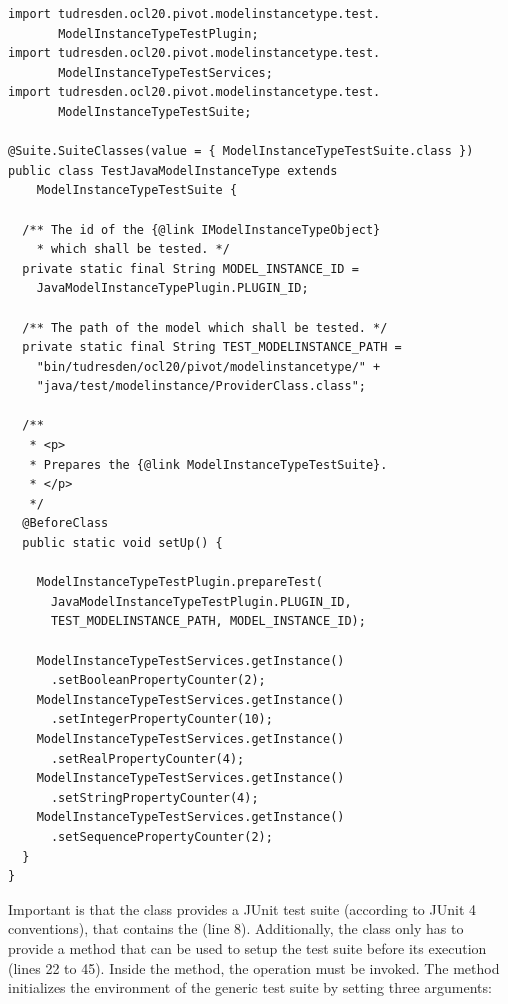 \lstset{
  language=Java
}
\begin{lstlisting}[caption={An instantiation of the generic model instance test suite.}, captionpos=b, label=list:modelInstanceTestSuite:constraints01, float]
import tudresden.ocl20.pivot.modelinstancetype.test.
       ModelInstanceTypeTestPlugin;
import tudresden.ocl20.pivot.modelinstancetype.test.
       ModelInstanceTypeTestServices;
import tudresden.ocl20.pivot.modelinstancetype.test.
       ModelInstanceTypeTestSuite;

@Suite.SuiteClasses(value = { ModelInstanceTypeTestSuite.class })
public class TestJavaModelInstanceType extends 
    ModelInstanceTypeTestSuite {

  /** The id of the {@link IModelInstanceTypeObject} 
    * which shall be tested. */
  private static final String MODEL_INSTANCE_ID =
    JavaModelInstanceTypePlugin.PLUGIN_ID;

  /** The path of the model which shall be tested. */
  private static final String TEST_MODELINSTANCE_PATH =
    "bin/tudresden/ocl20/pivot/modelinstancetype/" +
    "java/test/modelinstance/ProviderClass.class";

  /**
   * <p>
   * Prepares the {@link ModelInstanceTypeTestSuite}.
   * </p>
   */
  @BeforeClass
  public static void setUp() {

    ModelInstanceTypeTestPlugin.prepareTest(
      JavaModelInstanceTypeTestPlugin.PLUGIN_ID, 
      TEST_MODELINSTANCE_PATH, MODEL_INSTANCE_ID);

    ModelInstanceTypeTestServices.getInstance()
      .setBooleanPropertyCounter(2);
    ModelInstanceTypeTestServices.getInstance()
      .setIntegerPropertyCounter(10);
    ModelInstanceTypeTestServices.getInstance()
      .setRealPropertyCounter(4);
    ModelInstanceTypeTestServices.getInstance()
      .setStringPropertyCounter(4);
    ModelInstanceTypeTestServices.getInstance()
      .setSequencePropertyCounter(2);
  }
}
\end{lstlisting}

Important is that the class provides a JUnit test suite (according to JUnit 4 conventions), that contains the  (line 8). Additionally, the class only has to provide a  method that can be used to setup the test suite before its execution (lines 22 to 45). Inside the  method, the operation  must be invoked. The method initializes the environment of the generic test suite by setting three arguments:

